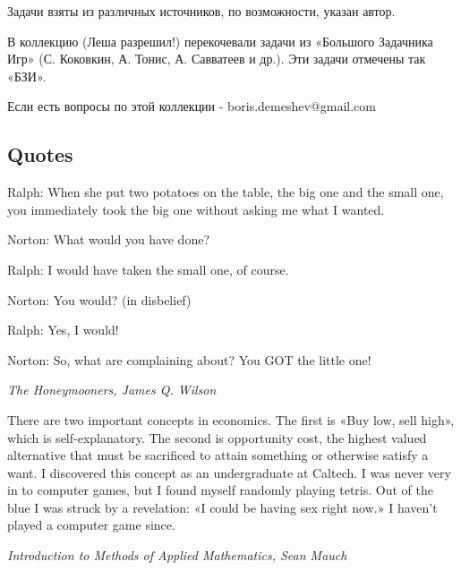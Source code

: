 
Задачи взяты из различных источников, по возможности, указан автор.

В коллекцию (Леша разрешил!) перекочевали задачи из «Большого Задачника Игр» (С. Коковкин, А. Тонис, А. Савватеев и др.). Эти задачи отмечены так «БЗИ».

Если есть вопросы по этой коллекции - boris.demeshev@gmail.com





\subsection{Quotes}

Ralph: When she put two potatoes on the table, the big one and the small one, you immediately took the big one without asking me what I wanted.\par
Norton: What would you have done?\par
Ralph: I would have taken the small one, of course.\par
Norton: You would? (in disbelief)\par
Ralph: Yes, I would!\par
Norton: So, what are complaining about? You GOT the little one!\par
{\it The Honeymooners, James Q. Wilson}\par

There are two important concepts in economics. The first is «Buy low, sell high», which is self-explanatory. The second is opportunity cost, the highest valued alternative that must be sacrificed to attain something or otherwise satisfy a want. I discovered this concept as an undergraduate at Caltech. I was never very in to computer games, but I found myself randomly playing tetris. Out of the blue I was struck by a revelation: «I could be having sex right now.» I haven't played a computer game since.\par
{\it Introduction to Methods of Applied Mathematics, Sean Mauch}\par

